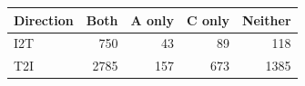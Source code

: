 \begin{tabular}{lrrrr}
\toprule
Direction & Both & A only & C only & Neither\\
\midrule
I2T & 750 & 43 & 89 & 118 \\
T2I & 2785 & 157 & 673 & 1385 \\
\bottomrule
\end{tabular}
